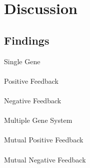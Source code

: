 \documentclass[]{article}
\begin{document}
%
%
%
%
%
\section{Discussion}

\subsection{Findings}
Single Gene\\
\\
Positive Feedback\\ 
\\
Negative Feedback\\
\\
Multiple Gene System\\
\\
Mutual Positive Feedback\\
\\
Mutual Negative Feedback\\
\\
\end{document}
